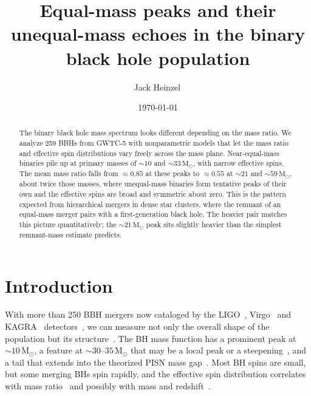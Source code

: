 \documentclass[%
 reprint,
 amsmath,amssymb,
 aps,
 prl,
 nofootinbib,nobibnotes,
 floatfix,
]{revtex4-2}
\newcommand{\Msun}{\ensuremath{\mathrm{M}_{\odot}}}
\newcommand{\featTen}{10\xspace}
\newcommand{\featTwenty}{21\xspace}
\newcommand{\featThirtyFive}{33\xspace}
\newcommand{\featSixty}{59\xspace}
\begin{document}
\title{Equal-mass peaks and their unequal-mass echoes in the binary black hole population}

\author{Jack Heinzel\,}

\date{\today}

\begin{abstract}
The binary black hole mass spectrum looks different depending on the mass ratio. We analyze 259 \acp{BBH} from \ac{GWTC-5} with nonparametric models that let the mass ratio and effective spin distributions vary freely across the mass plane. Near-equal-mass binaries pile up at primary masses of $\sim \featTen$ and $\sim \featThirtyFive\,\Msun$, with narrow effective spins. The mean mass ratio falls from $\approx 0.85$ at these peaks to $\approx 0.55$ at $\sim \featTwenty$ and $\sim \featSixty\,\Msun$, about twice those masses, where unequal-mass binaries form tentative peaks of their own and the effective spins are broad and symmetric about zero. This is the pattern expected from hierarchical mergers in dense star clusters, where the remnant of an equal-mass merger pairs with a first-generation black hole. The heavier pair matches this picture quantitatively; the $\sim \featTwenty\,\Msun$ peak sits slightly heavier than the simplest remnant-mass estimate predicts.
\end{abstract}

\maketitle

\section{Introduction}

With more than 250 \ac{BBH} mergers now cataloged by the LIGO~\cite{LIGOScientific:2014pky}, Virgo~\cite{VIRGO:2014yos} and KAGRA~\cite{KAGRA:2020tym} detectors~\cite{LIGOScientific:2025slb, LIGOScientific:2026wfs}, we can measure not only the overall shape of the population but its structure~\cite{KAGRA:2021duu, LIGOScientific:2025pvj, LIGOScientific:2026ctl}. The \ac{BH} mass function has a prominent peak at $\sim 10\,\Msun$, a feature at $\sim 30$--$35\,\Msun$ that may be a local peak or a steepening~\cite{Farah:2023vsc, Roy:2025ktr}, and a tail that extends into the theorized \ac{PISN} mass gap~\cite{Antonini:2025ilj, Tong:2025wpz, Ray:2025xti}. Most \ac{BH} spins are small, but some merging \acp{BH} spin rapidly, and the effective spin distribution correlates with mass ratio~\cite{Callister:2021fpo} and possibly with mass and redshift~\cite{Biscoveanu:2022qac, Heinzel:2023hlb}.
\end{document}
